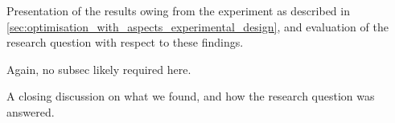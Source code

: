 






Presentation of the results owing from the experiment as described in
\cref{sec:optimisation_with_aspects_experimental_design}, and evaluation of the
research question with respect to these findings.

Again, no subsec likely required here.


A closing discussion on what we found, and how the research question was
answered.